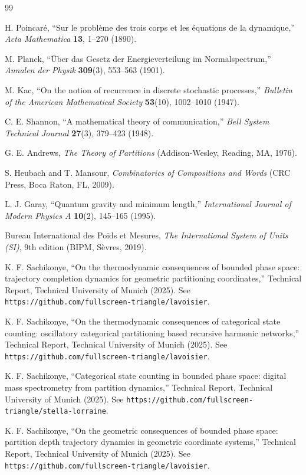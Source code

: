 \documentclass[twocolumn,10pt,a4paper]{article}
\theoremstyle{definition}
\theoremstyle{remark}
\begin{document}
\begin{thebibliography}{99}

 H. Poincar\'{e}, ``Sur le probl\`{e}me des trois corps et les \'{e}quations de la dynamique,'' \textit{Acta Mathematica} \textbf{13}, 1--270 (1890).

 M. Planck, ``\"{U}ber das Gesetz der Energieverteilung im Normalspectrum,'' \textit{Annalen der Physik} \textbf{309}(3), 553--563 (1901).

 M. Kac, ``On the notion of recurrence in discrete stochastic processes,'' \textit{Bulletin of the American Mathematical Society} \textbf{53}(10), 1002--1010 (1947).

 C. E. Shannon, ``A mathematical theory of communication,'' \textit{Bell System Technical Journal} \textbf{27}(3), 379--423 (1948).

 G. E. Andrews, \textit{The Theory of Partitions} (Addison-Wesley, Reading, MA, 1976).

 S. Heubach and T. Mansour, \textit{Combinatorics of Compositions and Words} (CRC Press, Boca Raton, FL, 2009).

 L. J. Garay, ``Quantum gravity and minimum length,'' \textit{International Journal of Modern Physics A} \textbf{10}(2), 145--165 (1995).

 Bureau International des Poids et Mesures, \textit{The International System of Units (SI)}, 9th edition (BIPM, S\`{e}vres, 2019).

 K. F. Sachikonye, ``On the thermodynamic consequences of bounded phase space: trajectory completion dynamics for geometric partitioning coordinates,'' Technical Report, Technical University of Munich (2025). See \texttt{https://github.com/fullscreen-triangle/lavoisier}.

 K. F. Sachikonye, ``On the thermodynamic consequences of categorical state counting: oscillatory categorical partitioning based recursive harmonic networks,'' Technical Report, Technical University of Munich (2025). See \texttt{https://github.com/fullscreen-triangle/lavoisier}.

 K. F. Sachikonye, ``Categorical state counting in bounded phase space: digital mass spectrometry from partition dynamics,'' Technical Report, Technical University of Munich (2025). See \texttt{https://github.com/fullscreen-triangle/stella-lorraine}.

 K. F. Sachikonye, ``On the geometric consequences of bounded phase space: partition depth trajectory dynamics in geometric coordinate systems,'' Technical Report, Technical University of Munich (2025). See \texttt{https://github.com/fullscreen-triangle/lavoisier}.

\end{thebibliography}
\end{document}
